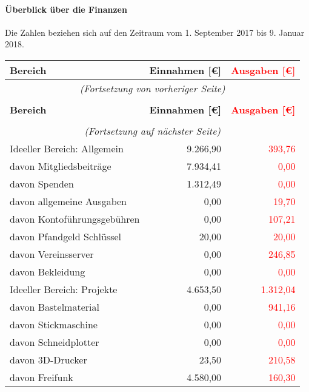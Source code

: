 \documentclass{s0minutes}
\begin{document}
\paragraph{Überblick über die Finanzen}
Die Zahlen beziehen sich auf den Zeitraum vom 1. September 2017 bis 9. Januar
2018.

\begin{longtable}{lr>{\textcolor{red}\bgroup}r<{\egroup}}
  \textbf{Bereich} & \textbf{Einnahmen [€]} & \textbf{Ausgaben [€]} \\
  \midrule
  \endfirsthead
  \multicolumn{3}{c}{\emph{(Fortsetzung von vorheriger Seite)}} \\
  \\
  \textbf{Bereich} & \textbf{Einnahmen [€]} & \textbf{Ausgaben [€]} \\
  \midrule
  \endhead
  \\
  \multicolumn{3}{c}{\emph{(Fortsetzung auf nächster Seite)}} \\
  \endfoot
  \endlastfoot
  Ideeller Bereich: Allgemein       &  9{.}266{,}90 &       393{,}76 \\
  \quad davon Mitgliedsbeiträge     &  7{.}934{,}41 &         0{,}00 \\
  \quad davon Spenden               &  1{.}312{,}49 &         0{,}00 \\
  \quad davon allgemeine Ausgaben   &        0{,}00 &        19{,}70 \\
  \quad davon Kontoführungsgebühren &        0{,}00 &       107{,}21 \\
  \quad davon Pfandgeld Schlüssel   &       20{,}00 &        20{,}00 \\
  \quad davon Vereinsserver         &        0{,}00 &       246{,}85 \\
  \quad davon Bekleidung            &        0{,}00 &         0{,}00 \\
  \midrule
  Ideeller Bereich: Projekte        &  4{.}653{,}50 &   1{.}312{,}04 \\
  \quad davon Bastelmaterial        &        0{,}00 &       941{,}16 \\
  \quad davon Stickmaschine         &        0{,}00 &         0{,}00 \\
  \quad davon Schneidplotter        &        0{,}00 &         0{,}00 \\
  \quad davon 3D-Drucker            &       23{,}50 &       210{,}58 \\
  \quad davon Freifunk              &  4{.}580{,}00 &       160{,}30 \\

\end{longtable}
\end{document}
